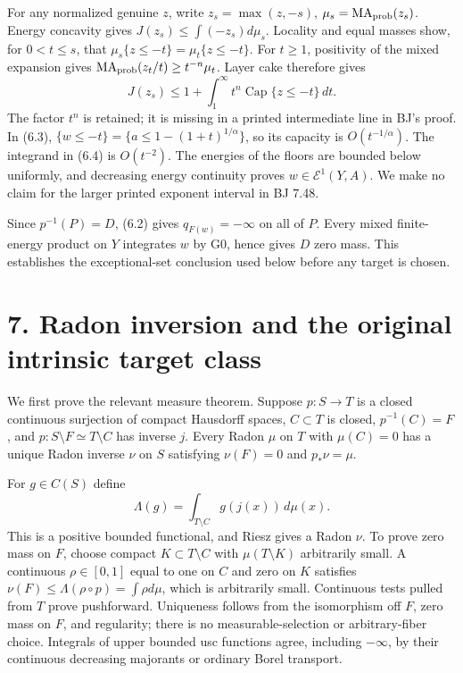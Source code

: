 \documentclass[
  10pt,
]{article}
\begin{document}
For any normalized genuine \(z\), write \(z_s=\max(z,-s)\),
\(\mu_s=\operatorname{MA}_{\rm prob}(z_s)\). Energy concavity gives
\(J(z_s)\leq\int(-z_s)d\mu_s\). Locality and equal masses show, for
\(0<t\leq s\), that \(\mu_s\{z\leq-t\}=\mu_t\{z\leq-t\}\). For
\(t\geq1\), positivity of the mixed expansion gives
\(\operatorname{MA}_{\rm prob}(z_t/t)\geq t^{-n}\mu_t\). Layer cake
therefore gives
\[J(z_s)\leq1+\int_1^\infty t^n\operatorname{Cap}\{z\leq-t\}\,dt. \tag{6.4}\]
The factor \(t^n\) is retained; it is missing in a printed intermediate
line in BJ's proof. In (6.3),
\(\{w\leq-t\}=\{a\leq1-(1+t)^{1/\alpha}\}\), so its capacity is
\(O(t^{-1/\alpha})\). The integrand in (6.4) is \(O(t^{-2})\). The
energies of the floors are bounded below uniformly, and decreasing
energy continuity proves \(w\in\mathcal E^1(Y,A)\). We make no claim for
the larger printed exponent interval in BJ 7.48.

Since \(p^{-1}(P)=D\), (6.2) gives \(q_{F(w)}=-\infty\) on all of \(P\).
Every mixed finite-energy product on \(Y\) integrates \(w\) by G0, hence
gives \(D\) zero mass. This establishes the exceptional-set conclusion
used below before any target is chosen.

\section{7. Radon inversion and the original intrinsic target
class}\label{radon-inversion-and-the-original-intrinsic-target-class}

We first prove the relevant measure theorem. Suppose \(p:S\to T\) is a
closed continuous surjection of compact Hausdorff spaces, \(C\subset T\)
is closed, \(p^{-1}(C)=F\), and \(p:S\setminus F\simeq T\setminus C\)
has inverse \(j\). Every Radon \(\mu\) on \(T\) with \(\mu(C)=0\) has a
unique Radon inverse \(\nu\) on \(S\) satisfying \(\nu(F)=0\) and
\(p_*\nu=\mu\).

For \(g\in C(S)\) define
\[\Lambda(g)=\int_{T\setminus C}g(j(x))\,d\mu(x).\] This is a positive
bounded functional, and Riesz gives a Radon \(\nu\). To prove zero mass
on \(F\), choose compact \(K\subset T\setminus C\) with
\(\mu(T\setminus K)\) arbitrarily small. A continuous \(\rho\in[0,1]\)
equal to one on \(C\) and zero on \(K\) satisfies
\(\nu(F)\leq\Lambda(\rho\circ p)=\int\rho d\mu\), which is arbitrarily
small. Continuous tests pulled from \(T\) prove pushforward. Uniqueness
follows from the isomorphism off \(F\), zero mass on \(F\), and
regularity; there is no measurable-selection or arbitrary-fiber choice.
Integrals of upper bounded usc functions agree, including \(-\infty\),
by their continuous decreasing majorants or ordinary Borel transport.
\end{document}
